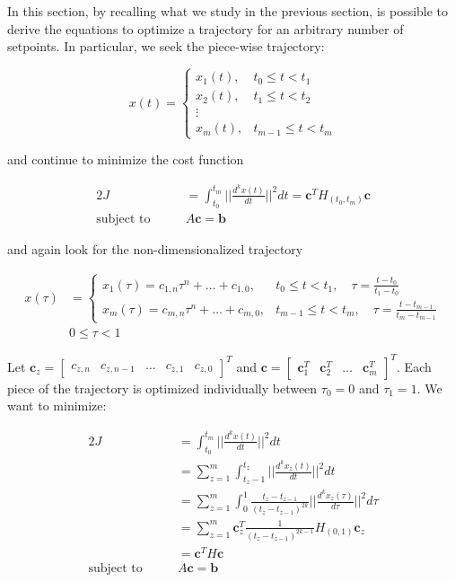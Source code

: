 In this section, by recalling what we study in the previous section, is possible to derive the equations to optimize a trajectory for an arbitrary number of setpoints. In particular, we seek the piece-wise trajectory:

\begin{equation}
	x(t)=
	\begin{cases}
		x_1(t), & t_0\le t<t_1 \\
		x_2(t), & t_1\le t<t_2 \\
		\vdots \\
		x_m(t), & t_{m-1}\le t<t_m 	
	\end{cases}
\end{equation}

\noindent and continue to minimize the cost function

\begin{alignat}{2}
	J &= \int_{t_0}^{t_m}\Bigg|\Bigg|\frac{d^kx(t)}{dt}\Bigg|\Bigg|^2dt = \mathbf{c}^TH_{(t_0,t_m)}\mathbf{c} \\
	\text{subject to}\qquad & A\mathbf{c} = \mathbf{b} \nonumber
\end{alignat}

\noindent and again look for the non-dimensionalized trajectory

\begin{align}
	x(\tau) &=
	\begin{cases}
		x_1(\tau) = c_{1,n}\tau^n+\dots+c_{1,0}, & t_0\le t<t_1,\quad \tau=\frac{t-t_0}{t_1-t_0} \\
		x_m(\tau) = c_{m,n}\tau^n+\dots+c_{m,0}, & t_{m-1}\le t<t_m,\quad \tau=\frac{t-t_{m-1}}{t_m-t_{m-1}}
	\end{cases} \\
	& 0\le\tau<1 \nonumber
\end{align}

\noindent Let $\mathbf{c}_z=\begin{bmatrix}c_{z,n} & c_{z,n-1} & \dots & c_{z,1} & c_{z,0}\end{bmatrix}^T$ and $\mathbf{c}=\begin{bmatrix}\mathbf{c}_1^T & \mathbf{c}_2^T & \dots & \mathbf{c}_m^T\end{bmatrix}^T$. Each piece of the trajectory is optimized individually between $\tau_0=0$ and $\tau_1=1$. We want to minimize:

\begin{alignat}{2}
	J &= \int_{t_0}^{t_m}\Bigg|\Bigg|\frac{d^kx(t)}{dt}\Bigg|\Bigg|^2dt \\
	&= \sum\limits_{z=1}^m\int_{t_z-1}^{t_z}\Bigg|\Bigg|\frac{d^kx_z(t)}{dt}\Bigg|\Bigg|^2dt \nonumber \\
	&= \sum\limits_{z=1}^m\int_0^1\frac{t_z-t_{z-1}}{(t_z-t_{z-1})^{2k}}\Bigg|\Bigg|\frac{d^kx_z(\tau)}{d\tau}\Bigg|\Bigg|^2d\tau \nonumber \\
	&= \sum\limits_{z=1}^m \mathbf{c}_z^T\frac{1}{(t_z-t_{z-1})^{2k-1}}H_{(0,1)}\mathbf{c}_z \nonumber \\
	&= \mathbf{c}^TH\mathbf{c} \nonumber \\
	\text{subject to} \qquad & A\mathbf{c}=\mathbf{b} \nonumber
\end{alignat}

